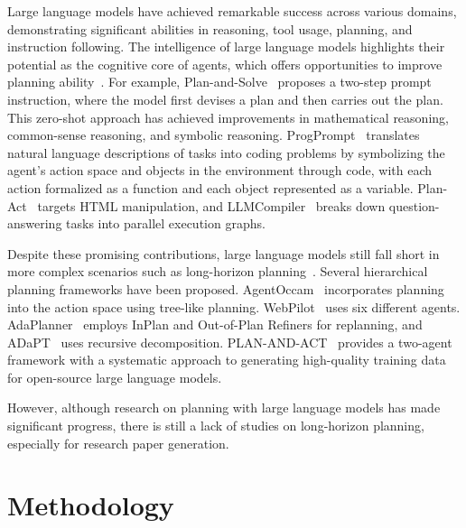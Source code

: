 \documentclass[manuscript,review,anonymous]{acmart}
\begin{document}
Large language models have achieved remarkable success across various domains, demonstrating significant abilities in reasoning, tool usage, planning, and instruction following. The intelligence of large language models highlights their potential as the cognitive core of agents, which offers opportunities to improve planning ability~\cite{huang2024understanding}. For example, Plan-and-Solve~\cite{wang2023plan} proposes a two-step prompt instruction, where the model first devises a plan and then carries out the plan. This zero-shot approach has achieved improvements in mathematical reasoning, common-sense reasoning, and symbolic reasoning. ProgPrompt~\cite{singh2023progprompt} translates natural language descriptions of tasks into coding problems by symbolizing the agent’s action space and objects in the environment through code, with each action formalized as a function and each object represented as a variable. Plan-Act~\cite{erdogan2025planact} targets HTML manipulation, and LLMCompiler~\cite{kim2024llm} breaks down question-answering tasks into parallel execution graphs.

Despite these promising contributions, large language models still fall short in more complex scenarios such as long-horizon planning~\cite{chen2024can}. Several hierarchical planning frameworks have been proposed. AgentOccam~\cite{yangagentoccam} incorporates planning into the action space using tree-like planning. WebPilot~\cite{zhang2025webpilot} uses six different agents. AdaPlanner~\cite{sun2023adaplanner} employs InPlan and Out-of-Plan Refiners for replanning, and ADaPT~\cite{prasad2024adapt} uses recursive decomposition. PLAN-AND-ACT~\cite{erdogan2025plan} provides a two-agent framework with a systematic approach to generating high-quality training data for open-source large language models.

However, although research on planning with large language models has made significant progress, there is still a lack of studies on long-horizon planning, especially for research paper generation.

\section{Methodology}
\end{document}
